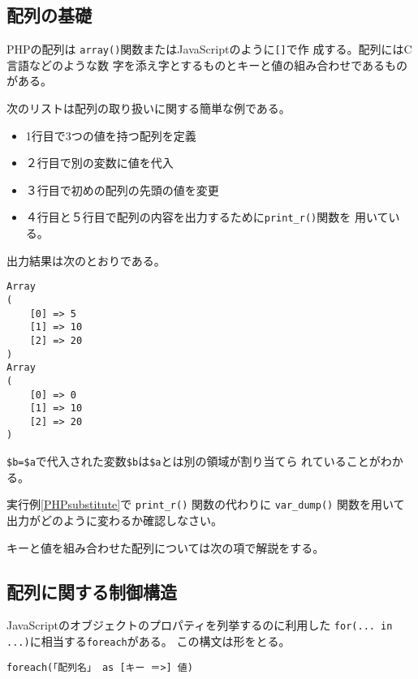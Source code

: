 \subsection{配列の基礎}
PHPの配列は \texttt{array()}関数またはJavaScriptのように\texttt{[]}で作
成する。配列にはC言語などのような数
字を添え字とするものとキーと値の組み合わせであるものがある。
\begin{Exec}
 \upshape
 次のリストは配列の取り扱いに関する簡単な例である。
\begin{itemize}
 \item 1行目で3つの値を持つ配列を定義
 \item ２行目で別の変数に値を代入
 \item ３行目で初めの配列の先頭の値を変更
 \item ４行目と５行目で配列の内容を出力するために\Verb+print_r()+関数を
			 用いている。
\end{itemize}
出力結果は次のとおりである。
\begin{Verbatim}
Array
(
    [0] => 5
    [1] => 10
    [2] => 20
)
Array
(
    [0] => 0
    [1] => 10
    [2] => 20
)
\end{Verbatim}
\Verb+$b=$a+で代入された変数\Verb+$b+は\Verb+$a+とは別の領域が割り当てら
れていることがわかる。
\end{Exec}
 \begin{Prob}\upshape
  実行例\ref{PHPsubstitute}で \Verb+print_r()+ 関数の代わりに
   \Verb+var_dump()+ 関数を用いて出力がどのように変わるか確認しなさい。
 \end{Prob}
キーと値を組み合わせた配列については次の項で解説をする。
\subsection{配列に関する制御構造}
JavaScriptのオブジェクトのプロパティを列挙するのに利用した
\texttt{for(... in ...)}に相当する\texttt{foreach}がある。
この構文は形をとる。

\texttt{foreach(「配列名」 as [キー ＝>] 値)}

